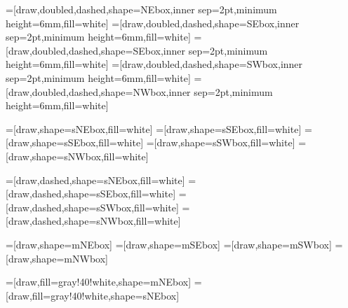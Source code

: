 =[draw,doubled,dashed,shape=NEbox,inner sep=2pt,minimum height=6mm,fill=white]
=[draw,doubled,dashed,shape=SEbox,inner sep=2pt,minimum height=6mm,fill=white]
=[draw,doubled,dashed,shape=SEbox,inner sep=2pt,minimum height=6mm,fill=white]
=[draw,doubled,dashed,shape=SWbox,inner sep=2pt,minimum height=6mm,fill=white]
=[draw,doubled,dashed,shape=NWbox,inner sep=2pt,minimum height=6mm,fill=white]

=[draw,shape=sNEbox,fill=white]
=[draw,shape=sSEbox,fill=white]
=[draw,shape=sSEbox,fill=white]
=[draw,shape=sSWbox,fill=white]
=[draw,shape=sNWbox,fill=white]

=[draw,dashed,shape=sNEbox,fill=white]
=[draw,dashed,shape=sSEbox,fill=white]
=[draw,dashed,shape=sSWbox,fill=white]
=[draw,dashed,shape=sNWbox,fill=white]

=[draw,shape=mNEbox]
=[draw,shape=mSEbox]
=[draw,shape=mSWbox]
=[draw,shape=mNWbox]

=[draw,fill=gray!40!white,shape=mNEbox]
=[draw,fill=gray!40!white,shape=sNEbox]



\makeatletter


